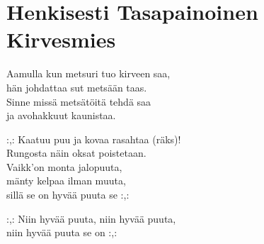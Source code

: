 \section{Henkisesti Tasapainoinen Kirvesmies}
Aamulla kun metsuri tuo kirveen saa,\\
hän johdattaa sut metsään taas.\\
Sinne missä metsätöitä tehdä saa\\
ja avohakkuut kaunistaa.

:,: Kaatuu puu ja kovaa rasahtaa (räks)!\\
Rungosta näin oksat poistetaan.\\
Vaikk'on monta jalopuuta,\\
mänty kelpaa ilman muuta,\\
sillä se on hyvää puuta se :,:

:,: Niin hyvää puuta, niin hyvää puuta,\\
niin hyvää puuta se on :,: